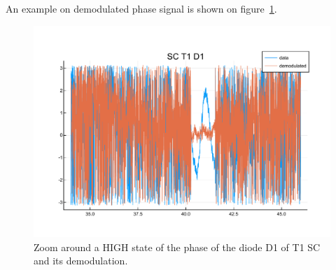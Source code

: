 \documentclass[a4paper,11pt,twoside]{scrartcl}
\begin{document}
An example on demodulated phase signal is shown on figure~\ref{fig:FaintDemodulated}.
\begin{figure}
    \centering
    \includegraphics[width=0.8\linewidth]{figs/FaintDemodulated.pdf}
    \caption{Zoom around a HIGH state of the phase of the diode D1 of T1 SC and its demodulation.}
    \label{fig:FaintDemodulated}
\end{figure}
\end{document}
